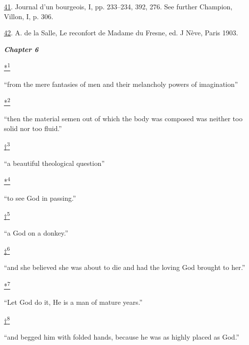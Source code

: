 \protect\hypertarget{23_NOTES.xhtmlux5cux23page_416}{\protect\hyperlink{12_Chapter_Five__THE_VISION_OF_DEAT.xhtmlux5cux23id_1273}{41}}.
Journal d'un bourgeois, I, pp. 233--234, 392, 276. See further Champion,
Villon, I, p. 306.

\protect\hypertarget{23_NOTES.xhtmlux5cux23id_1272}{\protect\hyperlink{12_Chapter_Five__THE_VISION_OF_DEAT.xhtmlux5cux23id_1271}{42}}.
A. de la Salle, Le reconfort de Madame du Fresne, ed. J Nève, Paris
1903.

\textbf{\emph{Chapter 6}}

\protect\hypertarget{23_NOTES.xhtmlux5cux23id_2990}{\protect\hyperlink{13_Chapter_Six__THE_DEPICTION_OF_TH.xhtmlux5cux23id_2989}{*\textsuperscript{1}}}
``from the mere fantasies of men and their melancholy powers of
imagination''

\protect\hypertarget{23_NOTES.xhtmlux5cux23id_2992}{\protect\hyperlink{13_Chapter_Six__THE_DEPICTION_OF_TH.xhtmlux5cux23id_2991}{*\textsuperscript{2}}}
``then the material semen out of which the body was composed was neither
too solid nor too fluid.''

\protect\hypertarget{23_NOTES.xhtmlux5cux23id_2994}{\protect\hyperlink{13_Chapter_Six__THE_DEPICTION_OF_TH.xhtmlux5cux23id_2993}{†\textsuperscript{3}}}
``a beautiful theological question''

\protect\hypertarget{23_NOTES.xhtmlux5cux23id_2996}{\protect\hyperlink{13_Chapter_Six__THE_DEPICTION_OF_TH.xhtmlux5cux23id_2995}{*\textsuperscript{4}}}
``to see God in passing.''

\protect\hypertarget{23_NOTES.xhtmlux5cux23id_2998}{\protect\hyperlink{13_Chapter_Six__THE_DEPICTION_OF_TH.xhtmlux5cux23id_2997}{†\textsuperscript{5}}}
``a God on a donkey.''

\protect\hypertarget{23_NOTES.xhtmlux5cux23id_3000}{\protect\hyperlink{13_Chapter_Six__THE_DEPICTION_OF_TH.xhtmlux5cux23id_2999}{‡\textsuperscript{6}}}
``and she believed she was about to die and had the loving God brought
to her.''

\protect\hypertarget{23_NOTES.xhtmlux5cux23id_3002}{\protect\hyperlink{13_Chapter_Six__THE_DEPICTION_OF_TH.xhtmlux5cux23id_3001}{*\textsuperscript{7}}}
``Let God do it, He is a man of mature years.''

\protect\hypertarget{23_NOTES.xhtmlux5cux23id_3004}{\protect\hyperlink{13_Chapter_Six__THE_DEPICTION_OF_TH.xhtmlux5cux23id_3003}{†\textsuperscript{8}}}
``and begged him with folded hands, because he was as highly placed as
God.''

